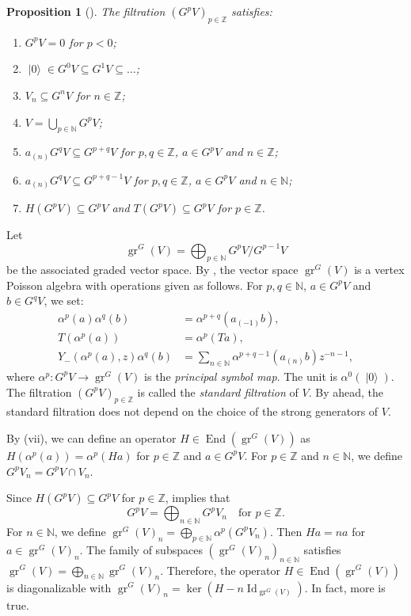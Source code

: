 \documentclass[a4paper, 12pt, reqno]{amsart}
\newtheorem{proposition}[theorem]{Proposition}
\theoremstyle{remark}
\numberwithin{equation}{subsection}
\DeclareMathOperator{\Id}{Id}
\DeclareMathOperator{\gr}{gr}
\DeclareMathOperator{\End}{End}
\DeclareMathOperator{\vac}{|0\rangle}
\begin{document}
\begin{proposition}[{\cite{li_vertex_2004}}]
  \label{prp:11}
  The filtration $(G^pV)_{p \in \mathbb{Z}}$ satisfies:
  \begin{enumerate}
  \item $G^pV = 0$ for $p < 0$;
  \item $\vac \in G^0V \subseteq G^1V \subseteq \dots$;
  \item $V_n \subseteq G^nV$ for $n \in \mathbb{Z}$;
  \item $V = \bigcup_{p \in \mathbb{N}}G^pV$;
  \item $a_{(n)}G^qV \subseteq G^{p + q}V$ for $p, q \in \mathbb{Z}$, $a \in G^pV$ and $n \in \mathbb{Z}$;
  \item $a_{(n)}G^qV \subseteq G^{p + q - 1}V$ for $p, q \in \mathbb{Z}$, $a \in G^pV$ and $n \in \mathbb{N}$;
  \item $H(G^pV) \subseteq G^pV$ and $T(G^pV) \subseteq G^pV$ for $p \in \mathbb{Z}$.
  \end{enumerate}
\end{proposition}

Let
\begin{equation*}
  \gr^G(V) = \bigoplus_{p \in \mathbb{N}}G^pV/G^{p - 1}V
\end{equation*}
be the associated graded vector space.
By \cite{li_vertex_2004}, the vector space $\gr^G(V)$ is a vertex Poisson algebra with operations given as follows.
For $p, q \in \mathbb{N}$, $a \in G^pV$ and $b \in G^qV$, we set:
\begin{align*}
  \alpha^p(a)\alpha^q(b) &= \alpha^{p + q}(a_{(-1)}b), \\
  T(\alpha^p(a)) &= \alpha^p(Ta), \\
  Y_-(\alpha^p(a), z)\alpha^q(b) &= \sum_{n \in \mathbb{N}}\alpha^{p + q - 1}(a_{(n)}b)z^{-n - 1},
\end{align*}
where $\alpha^p: G^pV \to \gr^G(V)$ is the \emph{principal symbol map}.
The unit is $\alpha^0(\vac)$.
The filtration $(G^pV)_{p \in \mathbb{Z}}$ is called the \emph{standard filtration} of $V$.
By  ahead, the standard filtration does not depend on the choice of the strong generators of $V$.

By (vii), we can define an operator $H \in \End(\gr^G(V))$ as $H(\alpha^p(a)) = \alpha^p(Ha)$ for $p \in \mathbb{Z}$ and $a \in G^pV$.
For $p \in \mathbb{Z}$ and $n \in \mathbb{N}$, we define $G^pV_n = G^pV \cap V_n$.

Since $H(G^pV) \subseteq G^pV$ for $p \in \mathbb{Z}$,  implies that
\begin{equation*}
  G^pV = \bigoplus_{n \in \mathbb{N}}G^pV_n \quad \text{for }p \in \mathbb{Z}.
\end{equation*}
For $n \in \mathbb{N}$, we define $\gr^G(V)_n = \bigoplus_{p \in \mathbb{N}}\alpha^p(G^pV_n)$.
Then $Ha = na$ for $a \in \gr^G(V)_n$.
The family of subspaces $(\gr^G(V)_n)_{n \in \mathbb{N}}$ satisfies $\gr^G(V) = \bigoplus_{n \in \mathbb{N}}\gr^G(V)_n$.
Therefore, the operator $H \in \End(\gr^G(V))$ is diagonalizable with $\gr^G(V)_n = \ker(H - n\Id_{\gr^G(V)})$.
In fact, more is true.
\end{document}
